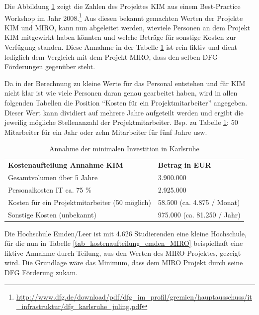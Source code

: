 Die Abbildung \ref{tab_minimale_investition_karlsruhe} zeigt die Zahlen des Projektes KIM aus einem Best-Practice Workshop im Jahr 2008.\footnote{\url{http://www.dfg.de/download/pdf/dfg_im_profil/gremien/hauptausschuss/it_infrastruktur/dfg_karlsruhe_juling.pdf}}
Aus diesen bekannt gemachten Werten der Projekte KIM und MIRO, kann nun abgeleitet werden, wieviele Personen an dem Projekt KIM mitgewirkt haben könnten und welche Beträge für sonstige Kosten zur Verfügung standen. Diese Annahme in der Tabelle \ref{tab_minimale_investition_karlsruhe} ist rein fiktiv und dient lediglich dem Vergleich mit dem Projekt MIRO, dass den selben DFG-Förderungen gegenüber steht.

Da in der Berechnung zu kleine Werte für das Personal entstehen und für KIM nicht klar ist wie viele Personen daran genau gearbeitet haben, wird in allen folgenden Tabellen die Position \enquote{Kosten für ein Projektmitarbeiter} angegeben. Dieser Wert kann dividiert auf mehrere Jahre aufgeteilt werden und ergibt die jeweilig mögliche Stellenanzahl der Projektmitarbeiter. Bsp. zu Tabelle \ref{tab_minimale_investition_karlsruhe}: 50 Mitarbeiter für ein Jahr oder zehn Mitarbeiter für fünf Jahre usw. 

\begin{table}[h!]
	\begin{tabularx}{\textwidth}{l|l}
		\hline
		\textbf{Kostenaufteilung Annahme KIM} & \textbf{Betrag in EUR}\\
		Gesamtvolumen über 5 Jahre & 3.900.000\\
		Personalkosten IT ca. 75 \% & 2.925.000\\
		Kosten für ein Projektmitarbeiter (50 möglich) & 58.500 (ca. 4.875 / Monat)\\ 
		Sonstige Kosten (unbekannt) & 975.000 (ca. 81.250 / Jahr)\\
		\hline
	\end{tabularx}
	\caption{Annahme der minimalen Investition in Karlsruhe}
	\label{tab_minimale_investition_karlsruhe}
\end{table}


Die Hochschule Emden/Leer ist mit 4.626 Studierenden eine kleine Hochschule, für die nun in Tabelle \ref{tab_kostenaufteilung_emden_MIRO} beispielhaft eine fiktive Annahme durch Teilung, aus den Werten des MIRO Projektes, gezeigt wird. Die Grundlage wäre das Minimum, dass dem MIRO Projekt durch seine DFG Förderung zukam.

